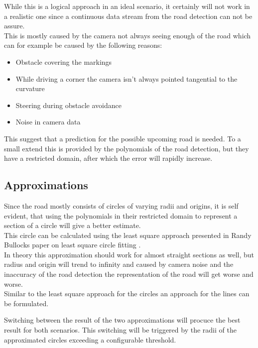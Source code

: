 While this is a logical approach in an ideal scenario, it certainly will not work in a realistic one since a continuous data stream from the road detection can not be assure.\\

This is mostly caused by the camera not always seeing enough of the road which can for example be caused by the following reasons:

\begin{itemize}
	\item Obstacle covering the markings
	\item While driving a corner the camera isn't always pointed tangential to the curvature
	\item Steering during obstacle avoidance
	\item Noise in camera data
\end{itemize}


This suggest that a prediction for the possible upcoming road is needed. To a small extend this is provided by the polynomials of the road detection, but they have a restricted domain, after which the error will rapidly increase.

\subsection{Approximations}

Since the road mostly consists of circles of varying radii and origins, it is self evident, that using the polynomials in their restricted domain to represent a section of a circle will give a better estimate.\\
This circle can be calculated using the least square approach presented in Randy Bullocks paper on least square circle fitting \cite{leastsquarecircle}.\\

In theory this approximation should work for almost straight sections as well, but radius and origin will trend to infinity and caused by camera noise and the inaccuracy of the road detection the representation of the road will get worse and worse.\\

Similar to the least square approach for the circles an approach for the lines can be formulated.

Switching between the result of the two approximations will procuce the best result for both scenarios. This switching will be triggered by the radii of the approximated circles exceeding a configurable threshold.\\

